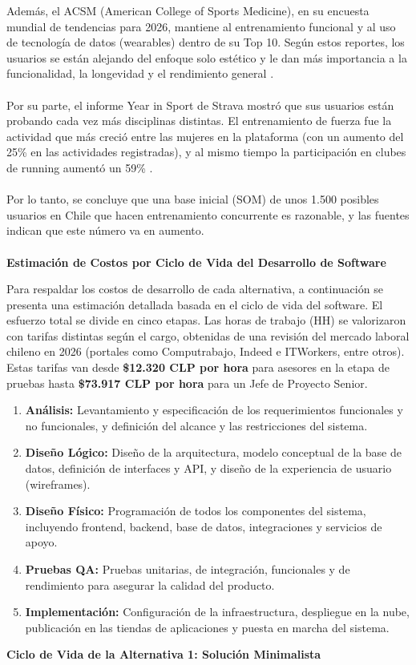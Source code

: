\vspace{0.3cm}
Además, el ACSM (American College of Sports Medicine), en su encuesta mundial de tendencias para 2026, mantiene al entrenamiento funcional y al uso de tecnología de datos (wearables) dentro de su Top 10. Según estos reportes, los usuarios se están alejando del enfoque solo estético y le dan más importancia a la funcionalidad, la longevidad y el rendimiento general \citep{acsm_trends}.
\\\\
Por su parte, el informe Year in Sport de Strava mostró que sus usuarios están probando cada vez más disciplinas distintas. El entrenamiento de fuerza fue la actividad que más creció entre las mujeres en la plataforma (con un aumento del 25\% en las actividades registradas), y al mismo tiempo la participación en clubes de running aumentó un 59\% \citep{strava_yis}.
\\\\
Por lo tanto, se concluye que una base inicial (SOM) de unos 1.500 posibles usuarios en Chile que hacen entrenamiento concurrente es razonable, y las fuentes indican que este número va en aumento.
\\\\
\textbf{Estimación de Costos por Ciclo de Vida del Desarrollo de Software}

Para respaldar los costos de desarrollo de cada alternativa, a continuación se presenta una estimación detallada basada en el ciclo de vida del software. El esfuerzo total se divide en cinco etapas. Las horas de trabajo (HH) se valorizaron con tarifas distintas según el cargo, obtenidas de una revisión del mercado laboral chileno en 2026 (portales como Computrabajo, Indeed e ITWorkers, entre otros). Estas tarifas van desde \textbf{\$12.320 CLP por hora} para asesores en la etapa de pruebas hasta \textbf{\$73.917 CLP por hora} para un Jefe de Proyecto Senior.

\begin{enumerate}
    \item \textbf{Análisis:} Levantamiento y especificación de los requerimientos funcionales y no funcionales, y definición del alcance y las restricciones del sistema.
    \item \textbf{Diseño Lógico:} Diseño de la arquitectura, modelo conceptual de la base de datos, definición de interfaces y API, y diseño de la experiencia de usuario (wireframes).
    \item \textbf{Diseño Físico:} Programación de todos los componentes del sistema, incluyendo frontend, backend, base de datos, integraciones y servicios de apoyo.
    \item \textbf{Pruebas QA:} Pruebas unitarias, de integración, funcionales y de rendimiento para asegurar la calidad del producto.
    \item \textbf{Implementación:} Configuración de la infraestructura, despliegue en la nube, publicación en las tiendas de aplicaciones y puesta en marcha del sistema.
\end{enumerate}
\newpage
\textbf{Ciclo de Vida de la Alternativa 1: Solución Minimalista}

